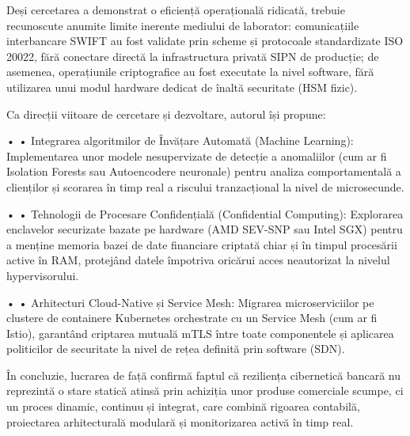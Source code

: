 Deși cercetarea a demonstrat o eficiență operațională ridicată, trebuie recunoscute anumite limite inerente mediului de laborator: comunicațiile interbancare SWIFT au fost validate prin scheme și protocoale standardizate ISO 20022, fără conectare directă la infrastructura privată SIPN de producție; de asemenea, operațiunile criptografice au fost executate la nivel software, fără utilizarea unui modul hardware dedicat de înaltă securitate (HSM fizic).

Ca direcții viitoare de cercetare și dezvoltare, autorul își propune:

• • Integrarea algoritmilor de Învățare Automată (Machine Learning): Implementarea unor modele nesupervizate de detecție a anomaliilor (cum ar fi Isolation Forests sau Autoencodere neuronale) pentru analiza comportamentală a clienților și scorarea în timp real a riscului tranzacțional la nivel de microsecunde.

• • Tehnologii de Procesare Confidențială (Confidential Computing): Explorarea enclavelor securizate bazate pe hardware (AMD SEV-SNP sau Intel SGX) pentru a menține memoria bazei de date financiare criptată chiar și în timpul procesării active în RAM, protejând datele împotriva oricărui acces neautorizat la nivelul hypervisorului.

• • Arhitecturi Cloud-Native și Service Mesh: Migrarea microserviciilor pe clustere de containere Kubernetes orchestrate cu un Service Mesh (cum ar fi Istio), garantând criptarea mutuală mTLS între toate componentele și aplicarea politicilor de securitate la nivel de rețea definită prin software (SDN).

În concluzie, lucrarea de față confirmă faptul că reziliența cibernetică bancară nu reprezintă o stare statică atinsă prin achiziția unor produse comerciale scumpe, ci un proces dinamic, continuu și integrat, care combină rigoarea contabilă, proiectarea arhitecturală modulară și monitorizarea activă în timp real.

